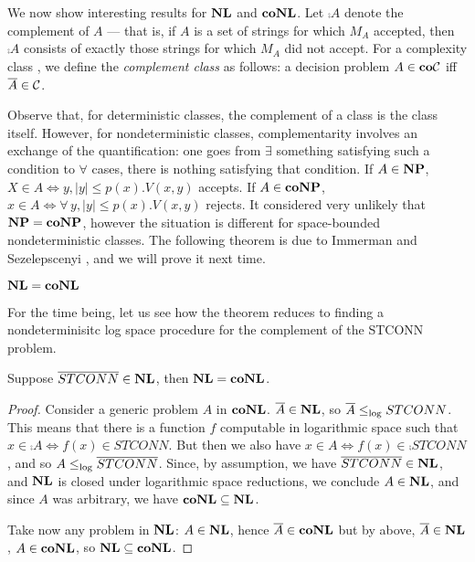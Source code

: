 \section{\conl}

We now show interesting results for $\nl$ and $\conl$.  Let
$\comp{A}$ denote the complement of $A$ --- that is, if $A$ is a set of
strings for which $M_A$ accepted, then $\comp{A}$ consists of exactly
those strings for which $M_A$ did not accept. For
a complexity class \genclass, we define the {\em complement class}
\cogenclass as follows:  a decision problem $A
\in \cogenclass$  iff $\comp{A} \in \genclass$.

Observe that, for deterministic classes, the complement of
a class is the class itself. However, for nondeterministic
classes, complementarity involves an exchange of the
quantification: one goes from $\exists$ something satisfying such a
condition to $\forall$ cases, there is nothing satisfying that
condition.  If $A\in \np$, $X \in A \Leftrightarrow y, |y| \leq p(x).
V(x,y)$ accepts. If $A \in \cnp$, $ x \in A
\Leftrightarrow \forall\, y, |y| \leq p(x) . V(x,y)$ rejects.
It considered very unlikely that $\np = \cnp$, however
the situation is different for space-bounded nondeterministic
classes. The following theorem is due to Immerman \cite{I88}
and Sezelepscenyi \cite{S88:nl}, and we will prove it next time.

\begin{Thm}
$\nl= \conl$
\end{Thm}

For the time being, let us see how the theorem reduces
to finding a nondeterminisitc log space procedure for
the complement of the STCONN problem.

\begin{Lem}
Suppose $\comp{STCONN} \in \nl$, then $\nl = \conl$.
\end{Lem}

\begin{proof}
Consider
a generic problem $A$ in $\conl$.
$\comp{A} \in \nl$, so $\overline{A} \leq_{\log} STCONN$.
This means that there is a function $f$ computable
in logarithmic space such that $x \in \comp A
 \Leftrightarrow f( x) \in STCONN$. But then we also have
$x \in  A \Leftrightarrow  f(x) \in \comp{STCONN}$,
and so $A \leq_{\log} \overline{STCONN}$. Since, by assumption,
we have $\comp {STCONN} \in \nl$, and $\nl$ is closed under
logarithmic space reductions, we conclude $A\in \nl$,
and since $A$ was arbitrary, we have $\conl \subseteq \nl$.

Take now any problem in $\nl$:
$A \in \nl$, hence $\comp{A} \in \conl$
but by above, $\comp{A} \in \nl$, $A \in \conl$, 
so $\nl \subseteq \conl$.
\end{proof}






